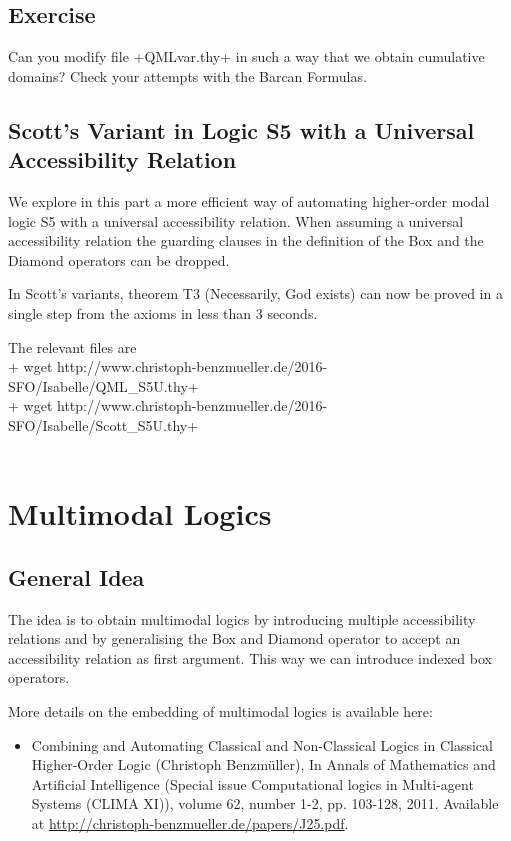 \documentclass{article}
\begin{document}
\subsection{Exercise}
Can you modify file +QMLvar.thy+  in such a way that we obtain
cumulative domains? Check your attempts with the Barcan Formulas.


\subsection{Scott's Variant in Logic S5 with a Universal Accessibility Relation}
We explore in this part a more efficient way of automating
higher-order modal logic S5 with a universal accessibility
relation. When assuming a universal accessibility
relation the guarding clauses in the definition of the Box and the
Diamond operators can be dropped. 

In Scott's variants, theorem T3 (Necessarily, God exists) can now be proved in a single
step from the axioms in less than 3 seconds.

The relevant files are \\[1em]
+ wget http://www.christoph-benzmueller.de/2016-SFO/Isabelle/QML_S5U.thy+ \\
+ wget http://www.christoph-benzmueller.de/2016-SFO/Isabelle/Scott_S5U.thy+\\
\\[1em]



\section{Multimodal Logics}

\subsection{General Idea}
The idea is to obtain multimodal logics by introducing multiple
accessibility relations and by generalising the Box and Diamond
operator to accept an accessibility relation as first argument. This
way we can introduce indexed box operators.

More details on the embedding of multimodal logics is available here:
\begin{itemize}
\item Combining and Automating Classical and Non-Classical Logics in
  Classical Higher-Order Logic (Christoph Benzm\"uller), In Annals of
  Mathematics and Artificial Intelligence (Special issue Computational
  logics in Multi-agent Systems (CLIMA XI)), volume 62, number 1-2,
  pp. 103-128, 2011. Available at
  \href{http://christoph-benzmueller.de/papers/J25.pdf}{http://christoph-benzmueller.de/papers/J25.pdf}.
\end{itemize}
\end{document}
